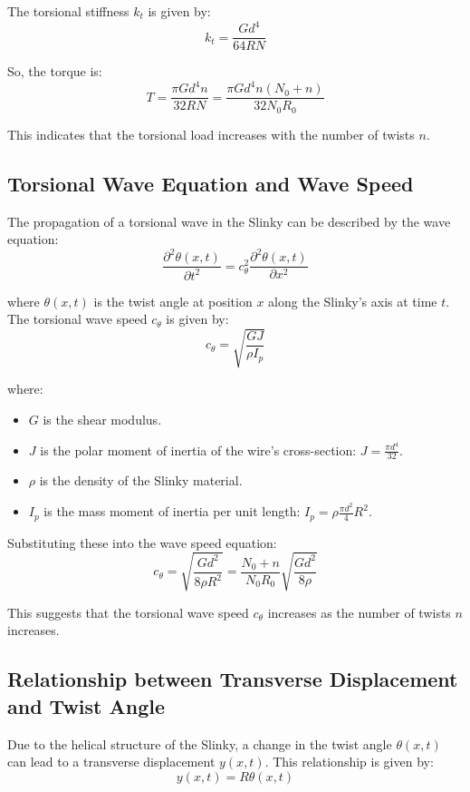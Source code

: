 \documentclass{mcmthesis}  %
\begin{document}
The torsional stiffness \(k_t\) is given by:
\begin{equation}
k_t = \frac{G d^4}{64 R N}
\end{equation}

So, the torque is:
\begin{equation}
T = \frac{\pi G d^4 n}{32 R N} = \frac{\pi G d^4 n (N_0+n)}{32 N_0 R_0}
\end{equation}

This indicates that the torsional load increases with the number of twists \(n\).

\subsection{Torsional Wave Equation and Wave Speed}
The propagation of a torsional wave in the Slinky can be described by the wave equation:
\begin{equation}
\frac{\partial^2 \theta(x,t)}{\partial t^2} = c_{\theta}^2 \frac{\partial^2 \theta(x,t)}{\partial x^2}
\end{equation}

where \(\theta(x,t)\) is the twist angle at position \(x\) along the Slinky's axis at time \(t\).
The torsional wave speed \(c_{\theta}\) is given by:
\begin{equation}
c_{\theta} = \sqrt{\frac{GJ}{\rho I_p}}
\end{equation}

where:
\begin{itemize}
    \item \(G\) is the shear modulus.
    \item \(J\) is the polar moment of inertia of the wire's cross-section: \(J = \frac{\pi d^4}{32}\).
    \item \(\rho\) is the density of the Slinky material.
    \item \(I_p\) is the mass moment of inertia per unit length: \(I_p = \rho \frac{\pi d^2}{4} R^2\).
\end{itemize}

Substituting these into the wave speed equation:
\begin{equation}
c_{\theta} = \sqrt{\frac{G d^2}{8 \rho R^2}} = \frac{N_0+n}{N_0 R_0} \sqrt{\frac{G d^2}{8 \rho}}
\end{equation}

This suggests that the torsional wave speed \(c_{\theta}\) increases as the number of twists \(n\) increases.

\subsection{Relationship between Transverse Displacement and Twist Angle}
Due to the helical structure of the Slinky, a change in the twist angle \(\theta(x,t)\) can lead to a transverse displacement \(y(x,t)\). This relationship is given by:
\begin{equation}
y(x,t) = R \theta(x,t)
\end{equation}
\end{document}
